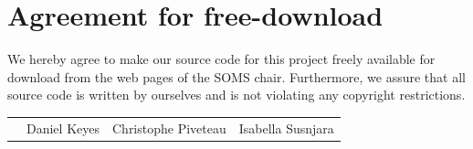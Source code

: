 \documentclass[11pt]{article}
\begin{document}

\newpage


\newpage
\section*{Agreement for free-download}
\bigskip


\bigskip


\large We hereby agree to make our source code for this project freely available for download from the web pages of the SOMS chair. Furthermore, we assure that all source code is written by ourselves and is not violating any copyright restrictions.

\begin{center}

\bigskip


\bigskip


\begin{tabular}{@{}p{1.3cm}@{}p{5cm}@{}@{}p{5cm}@{}@{}p{5cm}@{}}
\begin{minipage}{3cm}

\end{minipage}
&
\begin{minipage}{6cm}
\vspace{2mm} \large Daniel Keyes

 \vspace{\baselineskip}

\end{minipage}
&
\begin{minipage}{6cm}

\large Christophe Piveteau

\end{minipage}
&
\begin{minipage}{6cm}

\large Isabella Susnjara

\end{minipage}
\end{tabular}


\end{center}
\newpage




\end{document}
